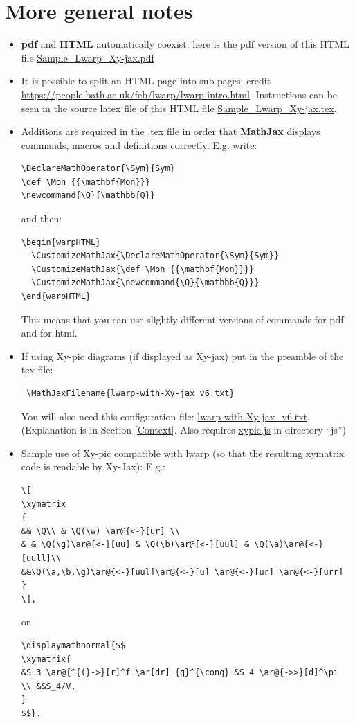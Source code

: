\documentclass[a4paper,12pt]{article}
\newtheorem{Fundamental Theorem}{Fundamental Theorem}
\DeclareMathOperator{\Sym}{Sym}
\newcommand{\Q}{\mathbb{Q}}
\renewcommand{\a}{{\alpha}}
\renewcommand{\b}{{\beta}}
\def \g {\gamma}
\def \w {\omega}
\begin{document}
\section{More general notes}
\begin{itemize}


\item \textbf{pdf} and \textbf{HTML} automatically coexist: here is the pdf version  of this HTML file \href{Sample_Lwarp_Xy-jax.pdf}{Sample\_Lwarp\_Xy-jax.pdf}

\item It is possible to split an HTML page into sub-pages: credit \url{https://people.bath.ac.uk/feb/lwarp/lwarp-intro.html}. Instructions can be seen in the source latex file of this HTML file  \href{Sample_Lwarp_Xy-jax.tex}{Sample\_Lwarp\_Xy-jax.tex}.

 \item Additions are required in the .tex file in order that \textbf{MathJax} displays commands, macros and definitions correctly.
        E.g. write:
\begin{verbatim}
\DeclareMathOperator{\Sym}{Sym}
\def \Mon {{\mathbf{Mon}}}
\newcommand{\Q}{\mathbb{Q}}
\end{verbatim}

and then:

\begin{verbatim}
\begin{warpHTML}
  \CustomizeMathJax{\DeclareMathOperator{\Sym}{Sym}}
  \CustomizeMathJax{\def \Mon {{\mathbf{Mon}}}}
  \CustomizeMathJax{\newcommand{\Q}{\mathbb{Q}}}
\end{warpHTML}
\end{verbatim}
This means that you can use slightly different versions of commands for pdf and for html.
\item If using Xy-pic diagrams (if displayed as Xy-jax) put in the preamble of the tex file:
\begin{verbatim}
 \MathJaxFilename{lwarp-with-Xy-jax_v6.txt}
\end{verbatim}
You will also need this configuration file: \href{lwarp-with-Xy-jax_v6.txt}{lwarp-with-Xy-jax\_v6.txt}.
(Explanation is in Section \ref{Context}. Also requires \href{https://raw.githubusercontent.com/sonoisa/XyJax-v3/master/build/xypic.js}{xypic.js} in directory ``js'')


\item Sample use of Xy-pic compatible with lwarp (so that the resulting xymatrix code  is readable by Xy-Jax):
E.g.:
\begin{verbatim}
\[
\xymatrix
{
&& \Q\\ & \Q(\w) \ar@{<-}[ur] \\
& & \Q(\g)\ar@{<-}[uu] & \Q(\b)\ar@{<-}[uul] & \Q(\a)\ar@{<-}[uull]\\
&&\Q(\a,\b,\g)\ar@{<-}[uul]\ar@{<-}[u] \ar@{<-}[ur] \ar@{<-}[urr]
}
\],
\end{verbatim}
or
\begin{verbatim}
\displaymathnormal{$$
\xymatrix{
&S_3 \ar@{^{(}->}[r]^f \ar[dr]_{g}^{\cong} &S_4 \ar@{->>}[d]^\pi
\\ &&S_4/V,
}
$$}.
\end{verbatim}



\end{itemize}
\end{document}
